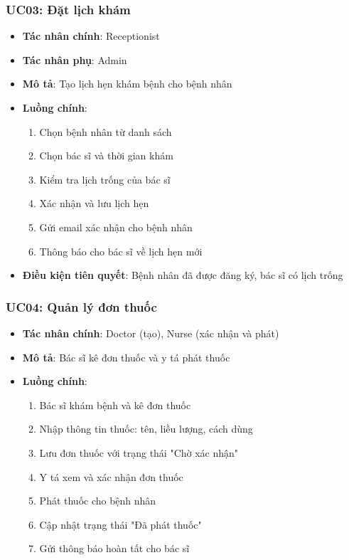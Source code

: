 \documentclass[12pt,a4paper]{report}
\begin{document}
\subsubsection{UC03: Đặt lịch khám}
\begin{itemize}
    \item \textbf{Tác nhân chính}: Receptionist
    \item \textbf{Tác nhân phụ}: Admin
    \item \textbf{Mô tả}: Tạo lịch hẹn khám bệnh cho bệnh nhân
    \item \textbf{Luồng chính}:
    \begin{enumerate}
        \item Chọn bệnh nhân từ danh sách
        \item Chọn bác sĩ và thời gian khám
        \item Kiểm tra lịch trống của bác sĩ
        \item Xác nhận và lưu lịch hẹn
        \item Gửi email xác nhận cho bệnh nhân
        \item Thông báo cho bác sĩ về lịch hẹn mới
    \end{enumerate}
    \item \textbf{Điều kiện tiên quyết}: Bệnh nhân đã được đăng ký, bác sĩ có lịch trống
\end{itemize}

\subsubsection{UC04: Quản lý đơn thuốc}
\begin{itemize}
    \item \textbf{Tác nhân chính}: Doctor (tạo), Nurse (xác nhận và phát)
    \item \textbf{Mô tả}: Bác sĩ kê đơn thuốc và y tá phát thuốc
    \item \textbf{Luồng chính}:
    \begin{enumerate}
        \item Bác sĩ khám bệnh và kê đơn thuốc
        \item Nhập thông tin thuốc: tên, liều lượng, cách dùng
        \item Lưu đơn thuốc với trạng thái "Chờ xác nhận"
        \item Y tá xem và xác nhận đơn thuốc
        \item Phát thuốc cho bệnh nhân
        \item Cập nhật trạng thái "Đã phát thuốc"
        \item Gửi thông báo hoàn tất cho bác sĩ
    \end{enumerate}
\end{itemize}
\end{document}
